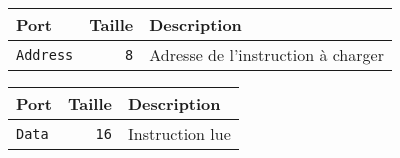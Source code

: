 
\begin{tabular}{|l|r|l|}
\hline
\textbf{Port}		& \textbf{Taille} & \textbf{Description}\\
\hline

\texttt{Address}	& \texttt{8} & Adresse de l'instruction à charger\\

\hline
\end{tabular}


\begin{tabular}{|l|r|l|}
\hline 
\textbf{Port} & \textbf{Taille} & \textbf{Description}\\
\hline 

\texttt{Data}		& \texttt{16} & Instruction lue\\

\hline
\end{tabular}




